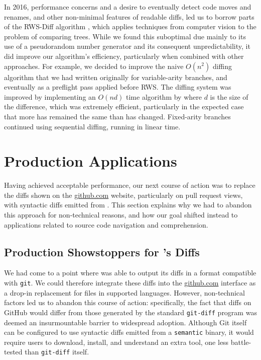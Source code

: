 \documentclass[acmsmall,fleqn,12pt]{acmart}
\begin{document}
In 2016, performance concerns and a desire to eventually detect code moves and
renames, and other non-minimal features of readable diffs, led us to borrow
parts of the RWS-Diff algorithm \cite{finis13rwsdiff}, which applies techniques
from computer vision to the problem of comparing trees. While we found this
suboptimal due mainly to its use of a pseudorandom number generator and its
consequent unpredictability, it did improve our algorithm's efficiency,
particularly when combined with other approaches. For example, we decided to
improve the naive $O(n^2)$ diffing algorithm that we had written originally for
variable-arity branches, and eventually as a preflight pass applied before RWS.
The diffing system was improved by implementing an $O(nd)$ time algorithm by
\citet{Myers86Diff} where $d$ is the size of the difference, which was
extremely efficient, particularly in the expected case that more has remained
the same than has changed. Fixed-arity branches continued using sequential
diffing, running in linear time.

\section{Production Applications} \label{sec:prodapps}

Having achieved acceptable performance, our next course of action was to
replace the diffs shown on the \href{https://github.com}{github.com} website,
particularly on pull request views, with syntactic diffs emitted from
\semantic{}. This section explains why we had to abandon this approach for
non-technical reasons, and how our goal shifted instead to applications
related to source code navigation and comprehension.

\subsection{Production Showstoppers for \semantic's Diffs}
We had come to a point where \semantic{} was able to output its diffs in a format
compatible with \texttt{git}. We could therefore integrate these diffs into the
\href{https://github.com}{github.com} interface as a drop-in replacement for
files in supported languages. However, non-technical factors led us to abandon
this course of action: specifically, the fact that diffs on GitHub would differ
from those generated by the standard \texttt{git-diff} program was deemed an
insurmountable barrier to widespread adoption. Although Git itself can be
configured to use syntactic diffs emitted from a \texttt{semantic} binary, it
would require users to download, install, and understand an extra tool, one
less battle-tested than \texttt{git-diff} itself.
\end{document}
